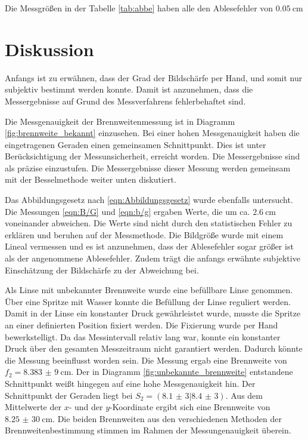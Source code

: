 

Die Messgrößen in der Tabelle \ref{tab:abbe} haben alle den Ablesefehler
von $\SI{0,05}{\centi\meter}$

\section{Diskussion}

Anfangs ist zu erwähnen, dass der Grad der Bildschärfe per Hand, und somit
nur subjektiv bestimmt werden konnte. Damit ist anzunehmen, dass die Messergebnisse
auf Grund des Messverfahrens fehlerbehaftet sind.

Die Messgenauigkeit der Brennweitenmessung ist in Diagramm
\ref{fig:brennweite_bekannt} einzusehen. Bei einer hohen Messgenauigkeit haben
die eingetragenen Geraden einen gemeinsamen Schnittpunkt. Dies ist unter
Berücksichtigung der Messunsicherheit, erreicht worden. Die Messergebnisse
sind als präzise einzustufen.
Die Messergebnisse dieser Messung werden gemeinsam mit der Besselmethode
weiter unten diskutiert.

Das Abbildungsgesetz nach \eqref{eqn:Abbildungsgesetz} wurde ebenfalls
untersucht. Die Messungen \eqref{eqn:B/G} und \eqref{eqn:b/g} ergaben Werte,
die um ca. $\SI{2,6}{\centi\meter}$ voneinander abweichen. Die Werte sind nicht durch
den statistischen Fehler zu erklären und beruhen auf der Messmethode.
Die Bildgröße wurde mit einem Lineal vermessen und es ist anzunehmen,
dass der Ablesefehler sogar größer ist als der angenommene Ablesefehler.
Zudem trägt die anfangs erwähnte subjektive Einschätzung der Bildschärfe
zu der Abweichung bei.

Als Linse mit unbekannter Brennweite wurde eine befüllbare Linse genommen. Über eine
Spritze mit Wasser konnte die Befüllung der Linse reguliert werden.
Damit in der Linse ein konstanter Druck gewährleistet wurde, musste die Spritze an
einer definierten Position fixiert werden.
Die Fixierung wurde per Hand bewerkstelligt. Da das Messintervall relativ lang
war, konnte ein konstanter Druck über den gesamten Messzeitraum nicht
garantiert werden. Dadurch könnte
die Messung beeinflusst worden sein. Die Messung ergab eine Brennweite von
$f_2 = \SI{8,383(9)}{\centi\meter}$. Der in Diagramm
\ref{fig:unbekannte_brennweite} entstandene Schnittpunkt weißt hingegen auf eine
hohe Messgenauigkeit hin. Der Schnittpunkt der Geraden liegt bei $S_2 =
(\num{8,1(3)}|\num{8,4(3)})$.
Aus dem Mittelwerte der $x$- und der $y$-Koordinate ergibt sich eine
Brennweite von $\SI{8,25(30)}{\centi\meter}$.
Die beiden Brennweiten aus den verschiedenen Methoden der Brennweitenbestimmung
stimmen im Rahmen der Messungenauigkeit überein.

